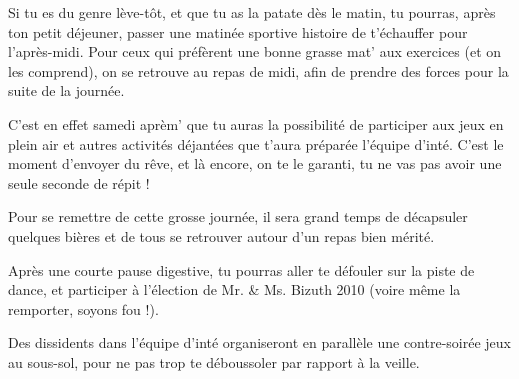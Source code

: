 Si tu es du genre lève-tôt, et que tu as la patate dès le matin, tu pourras,
après ton petit déjeuner, passer une matinée sportive histoire de
t'échauffer pour l'après-midi. Pour ceux qui préfèrent une bonne grasse
mat' aux exercices (et on les comprend), on se retrouve au repas de midi, afin de
prendre des forces pour la suite de la journée.

C'est en effet samedi aprèm' que tu auras la possibilité de participer aux
jeux en plein air et autres activités déjantées que t'aura préparée l'équipe d'inté. C'est
le moment d'envoyer du rêve, et là encore, on te le garanti, tu ne
vas pas avoir une seule seconde de répit !

Pour se remettre de cette grosse journée, il sera grand temps de décapsuler
quelques bières et de tous se retrouver autour d'un repas bien mérité.

Après une courte pause digestive, tu pourras aller te défouler sur la piste de
dance, et participer à l'élection de Mr. \& Ms. Bizuth 2010 (voire même la remporter, soyons fou !).

Des dissidents dans l'équipe d'inté organiseront en parallèle une contre-soirée jeux au
sous-sol, pour ne pas trop te déboussoler par rapport à la veille.
